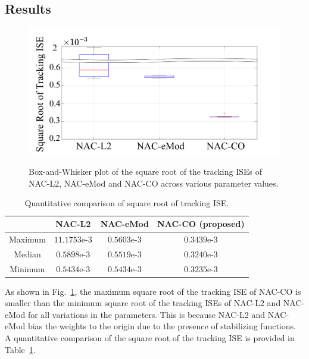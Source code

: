 \documentclass[letterpaper, 10 pt, conference]{ieeeconf}  %
\begin{document}
\subsection{Results}

\begin{figure}[!t]      
    \centering
    {\includegraphics[width=.85\linewidth]{fig/BoxWhisker.drawio.png}}
\caption{Box-and-Whisker plot of the square root of the tracking ISEs of NAC-L2, NAC-eMod and NAC-CO across various parameter values.}
    \label{fig: Box-beard plot}
\end{figure}

\begin{table}[!t]
    \renewcommand{\arraystretch}{1.3}
    \caption{Quantitative comparison of square root of tracking ISE.}
    \centering
    \begin{tabular}{|c||c|c|c|}
    \hline
     & \textbf{NAC-L2} & \textbf{NAC-eMod} & \textbf{NAC-CO} (proposed) 
     \\
    \hline 
    Maximum         & $11.1753$e-3 & $0.5603$e-3 & $0.3439$e-3 \\
    \hline
    Median          & $0.5898$e-3 & $0.5519$e-3 & $0.3240$e-3 \\
    \hline
    Minimum         & $0.5434$e-3 & $0.5434$e-3 & $0.3235$e-3 \\
    \hline
    \end{tabular}
    \label{table: error norm}
\end{table}

As shown in Fig.~\ref{fig: Box-beard plot}, the maximum square root of the tracking ISE of NAC-CO is smaller than the minimum square root of the tracking ISEs of NAC-L2 and NAC-eMod for all variations in the parameters.
This is because NAC-L2 and NAC-eMod bias the weights to the origin due to the presence of stabilizing functions.
A quantitative comparison of the square root of the tracking ISE is provided in Table~\ref{table: error norm}.
\end{document}
